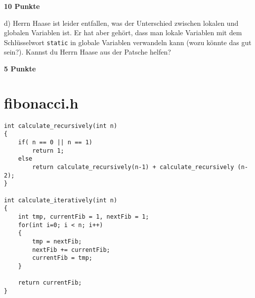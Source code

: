 \documentclass{article}
\begin{document}
\begin{flushright}
	\textbf{10 Punkte}
\end{flushright}

\bigskip

d) Herrn Haase ist leider entfallen, was der Unterschied zwischen lokalen und globalen Variablen ist. Er hat aber gehört, dass man lokale Variablen mit dem Schlüsselwort \texttt{static} in globale Variablen verwandeln kann (wozu könnte das gut sein?). Kannst du Herrn Haase aus der Patsche helfen? 

\begin{flushright}
	\textbf{5 Punkte}
\end{flushright}

\newpage

\section{fibonacci.h}

\begin{verbatim}
int calculate_recursively(int n)
{
	if( n == 0 || n == 1)
		return 1;
	else
		return calculate_recursively(n-1) + calculate_recursively (n-2);
}

int calculate_iteratively(int n)
{
	int tmp, currentFib = 1, nextFib = 1;
	for(int i=0; i < n; i++)
	{
		tmp = nextFib;
		nextFib += currentFib;
		currentFib = tmp;
	}

	return currentFib;
}

\end{verbatim}
\end{document}
